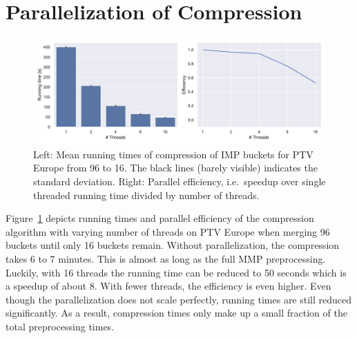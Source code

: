\documentclass[a4paper,UKenglish,cleveref, autoref, thm-restate,anonymous]{lipics-v2021}
\begin{document}
\section{Parallelization of Compression}\label{sec:appendix:parallelization}

\begin{figure}
\centering
\includegraphics[width=\linewidth]{fig/parallelization.pdf}
\caption{
Left: Mean running times of compression of IMP buckets for PTV Europe from 96 to 16. The black lines (barely visible) indicates the standard deviation.
Right: Parallel efficiency, i.e.\ speedup over single threaded running time divided by number of threads.
}\label{fig:comp_par}
\end{figure}

Figure~\ref{fig:comp_par} depicts running times and parallel efficiency of the compression algorithm with varying number of threads on PTV Europe when merging 96 buckets until only 16 buckets remain.
Without parallelization, the compression takes 6 to 7 minutes.
This is almost as long as the full MMP preprocessing.
Luckily, with 16 threads the running time can be reduced to 50 seconds which is a speedup of about 8.
With fewer threads, the efficiency is even higher.
Even though the parallelization does not scale perfectly, running times are still reduced significantly.
As a result, compression times only make up a small fraction of the total preprocessing times.



\end{document}
